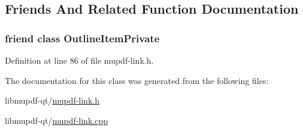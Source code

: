 \subsection{Friends And Related Function Documentation}
\hypertarget{class_mu_p_d_f_1_1_link_launch_ab008ed670017e41b6e6bba8707c775d2}{
\subsubsection[{Outline\-Item\-Private}]{\setlength{\rightskip}{0pt plus 5cm}friend class Outline\-Item\-Private\hspace{0.3cm}{\ttfamily [friend]}}}\label{class_mu_p_d_f_1_1_link_launch_ab008ed670017e41b6e6bba8707c775d2}


Definition at line 86 of file mupdf-\/link.\-h.



The documentation for this class was generated from the following files\-:\begin{DoxyCompactItemize}
\item 
libmupdf-\/qt/\hyperlink{mupdf-link_8h}{mupdf-\/link.\-h}\item 
libmupdf-\/qt/\hyperlink{mupdf-link_8cpp}{mupdf-\/link.\-cpp}\end{DoxyCompactItemize}
